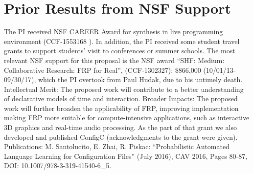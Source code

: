 \section{Prior Results from NSF Support}

The PI received NSF CAREER Award for synthesis in live programming environment
(CCF-1553168 ). In addition, the PI received some student travel grants to support students' visit 
to conferences or summer schools. The most relevant NSF support for this proposal is the
NSF award ``SHF: Medium: Collaborative Research: FRP for Real'',
(CCF-1302327); \$866,000 (10/01/13-09/30/17), which the PI overtook  from 
Paul Hudak, due to his untimely death. Intellectual Merit: The
proposed work will contribute to a better understanding of declarative models
of time and interaction. Broader Impacts: The proposed work will further broaden
the applicability of FRP, improving implementation making FRP more suitable for
compute-intensive applications, such as interactive 3D graphics and real-time audio
processing. As the part of that grant we also developed and published ConfigC
(acknowledgments to the grant were given). Publications: M. Santolucito, 
E. Zhai, R. Piskac: ``Probabilistic Automated Language Learning for Configuration Files''
(July 2016), CAV 2016, Pages 80-87, DOI: 10.1007/978-3-319-41540-6\_5.

